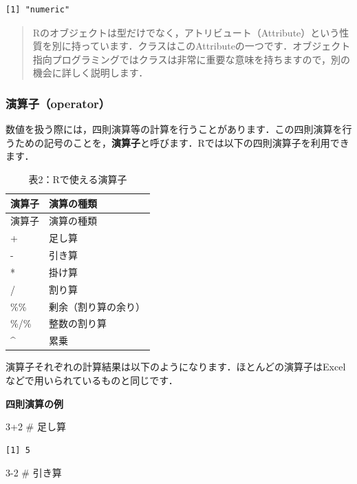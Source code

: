 \documentclass[
  letterpaper,
  DIV=11,
  numbers=noendperiod]{scrreprt}
\newenvironment{Shaded}{\begin{snugshade}}{\end{snugshade}}
\newcommand{\CommentTok}[1]{\textcolor[rgb]{0.37,0.37,0.37}{#1}}
\newcommand{\DecValTok}[1]{\textcolor[rgb]{0.68,0.00,0.00}{#1}}
\newcommand{\SpecialCharTok}[1]{\textcolor[rgb]{0.37,0.37,0.37}{#1}}
\begin{document}
\begin{verbatim}
[1] "numeric"
\end{verbatim}

\begin{quote}
Rのオブジェクトは型だけでなく，アトリビュート（Attribute）という性質を別に持っています．クラスはこのAttributeの一つです．オブジェクト指向プログラミングではクラスは非常に重要な意味を持ちますので，別の機会に詳しく説明します．
\end{quote}

\hypertarget{ux6f14ux7b97ux5b50operator}{%
\subsubsection{演算子（operator）}\label{ux6f14ux7b97ux5b50operator}}

数値を扱う際には，四則演算等の計算を行うことがあります．この四則演算を行うための記号のことを，\textbf{演算子}と呼びます．Rでは以下の四則演算子を利用できます．

\begin{longtable}[]{@{}ll@{}}
\caption{表2：Rで使える演算子}\tabularnewline
\toprule()
演算子 & 演算の種類 \\
\midrule()
\endfirsthead
\toprule()
演算子 & 演算の種類 \\
\midrule()
\endhead
+ & 足し算 \\
- & 引き算 \\
* & 掛け算 \\
/ & 割り算 \\
\%\% & 剰余（割り算の余り） \\
\%/\% & 整数の割り算 \\
\^{} & 累乗 \\
\bottomrule()
\end{longtable}

演算子それぞれの計算結果は以下のようになります．ほとんどの演算子はExcelなどで用いられているものと同じです．

\textbf{四則演算の例}

\begin{Shaded}
\begin{Highlighting}[]
\DecValTok{3}\SpecialCharTok{+}\DecValTok{2} \CommentTok{\# 足し算}
\end{Highlighting}
\end{Shaded}

\begin{verbatim}
[1] 5
\end{verbatim}

\begin{Shaded}
\begin{Highlighting}[]
\DecValTok{3{-}2} \CommentTok{\# 引き算}
\end{Highlighting}
\end{Shaded}
\end{document}
